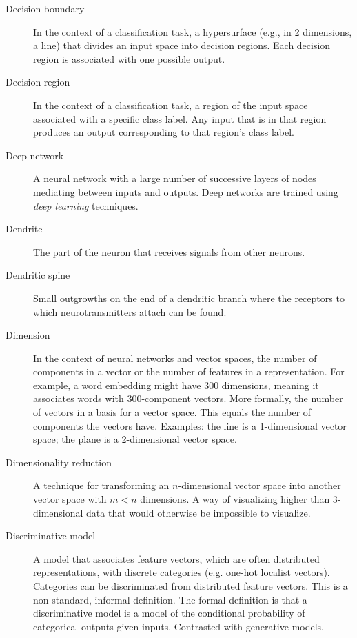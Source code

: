 \begin{description}
\item[Decision boundary] In the context of a classification task, a hypersurface (e.g., in 2 dimensions, a line) that divides an input space into decision regions. Each decision region is associated with one possible output.

\item[Decision region] In the context of a classification task, a region of the input space associated with a specific class label. Any input that is in that region produces an output corresponding to that region's class label.

\item[Deep network] A neural network with a large number of successive layers of nodes mediating between inputs and outputs. Deep networks are trained using \emph{deep learning} techniques.

\item[Dendrite] The part of the neuron that receives signals from other neurons.

\item[Dendritic spine] Small outgrowths on the end of a dendritic branch where the receptors to which neurotransmitters attach can be found.

\item[Dimension] In the context of neural networks and vector spaces, the number of components in a vector or the number of features in a representation. For example, a word embedding might have 300 dimensions, meaning it associates words with 300-component vectors. More formally, the number of vectors in a basis for a vector space. This equals the number of components the vectors have. Examples: the line is a 1-dimensional vector space; the plane is a 2-dimensional vector space.

\item[Dimensionality reduction] A technique for transforming an $n$-dimensional vector space into another vector space with $m<n$ dimensions. A way of visualizing higher than 3-dimensional data that would otherwise be impossible to visualize.

\item[Discriminative model] A model that associates feature vectors, which are often distributed representations, with discrete categories (e.g. one-hot localist vectors).  Categories can be discriminated from distributed feature vectors. This is a non-standard, informal definition. The formal definition is that a discriminative model is a model of the conditional probability of categorical outputs given inputs. Contrasted with generative models.


\end{description}
